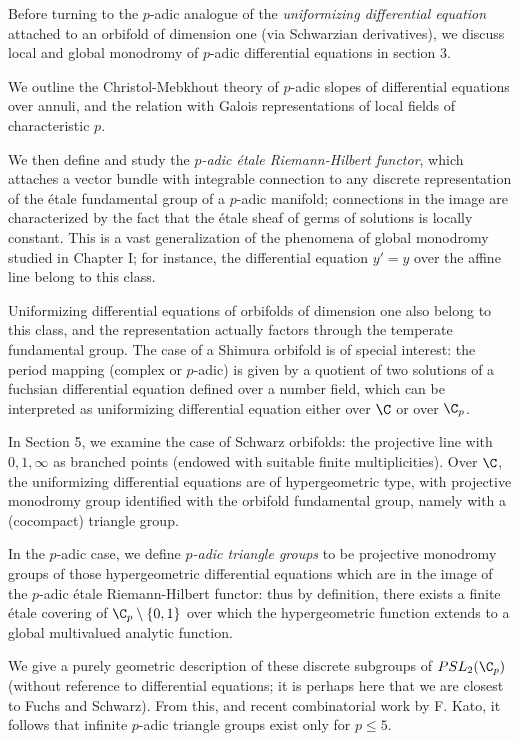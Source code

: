 Before turning to the $p$-adic analogue of the {\it uniformizing
differential equation} attached to an orbifold of dimension one (via
Schwarzian derivatives), we discuss local and global monodromy of
$p$-adic differential equations in section 3.  
 
We outline the Christol-Mebkhout theory of $p$-adic slopes of
differential equations over annuli, and the relation with Galois
representations of local fields of characteristic $p$.

We then define and study the {\it $p$-adic \'etale Riemann-Hilbert
functor}, which attaches a vector bundle with integrable connection to
any discrete representation of the \'etale fundamental group of a
$p$-adic manifold; connections in the image are characterized by the
fact that the \'etale sheaf of germs of solutions is locally
constant. This is a vast generalization of the phenomena of global
monodromy studied in Chapter I; for instance, the differential equation
$y'=y$ over the affine line belong to this class.

Uniformizing differential equations of orbifolds of dimension one also
belong to this class, and the representation actually factors through
the temperate fundamental group.  The case of a Shimura orbifold is of
special interest: the period mapping (complex or $p$-adic) is given by a
quotient of two solutions of a fuchsian differential equation defined
over a number field, which can be interpreted as uniformizing
differential equation either over $\C$ or over $\C_p$.

In Section 5, we examine the case of Schwarz orbifolds: the projective
line with $0,1,\infty$ as branched points (endowed with suitable
finite multiplicities). Over $\C$, the uniformizing differential
equations are of hypergeometric type, with projective monodromy group
identified with the orbifold fundamental group, namely with a
(cocompact) triangle group.

In the $p$-adic case, we define {\it $p$-adic triangle groups} to be
projective monodromy groups of those hypergeometric differential
equations which are in the image of the $p$-adic \'etale Riemann-Hilbert
functor: thus by definition, there exists a finite \'etale covering of
$\C_p\setminus \{0,1\}$ over which the hypergeometric function extends
to a global multivalued analytic function.

We give a purely geometric description of these discrete subgroups of
$PSL_2(\C_p)$ (without reference to differential equations; it is
perhaps here that we are closest to Fuchs and Schwarz).  From this, and
recent combinatorial work by F. Kato, it follows that infinite $p$-adic
triangle groups exist only for $p\leq 5$.

